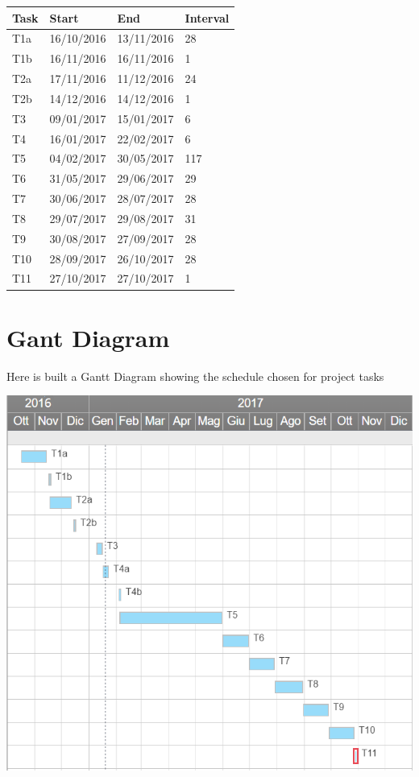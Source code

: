 \begin{center}
	\begin{tabulary}{\linewidth\tymin=70pt}{Y{1cm}|Y{3cm}|Y{3cm}|Y{1.7cm}}
		\textbf{Task} & \textbf{Start} & \textbf{End} & \textbf{Interval} \\ \hline
		T1a & 16/10/2016 & 13/11/2016 & 28\\ \hline
		T1b & 16/11/2016 & 16/11/2016 & 1\\ \hline
		T2a & 17/11/2016 & 11/12/2016 & 24\\ \hline
		T2b & 14/12/2016 & 14/12/2016 & 1\\ \hline
		T3 & 09/01/2017 & 15/01/2017 & 6\\ \hline
		T4 & 16/01/2017 & 22/02/2017 & 6\\ \hline
		T5 & 04/02/2017 & 30/05/2017 & 117\\ \hline
		T6 & 31/05/2017 & 29/06/2017 & 29\\ \hline
		T7 & 30/06/2017 & 28/07/2017 & 28\\ \hline
		T8 & 29/07/2017 & 29/08/2017 & 31\\ \hline
		T9 & 30/08/2017 & 27/09/2017 & 28\\ \hline
		T10 & 28/09/2017 & 26/10/2017 & 28\\ \hline
		T11 & 27/10/2017 & 27/10/2017 & 1\\
	\end{tabulary}
\end{center}

\section{Gant Diagram}
Here is built a Gantt Diagram showing the schedule chosen for \PowerEnJoy{} project tasks

\begin{center}
  \includegraphics[width=\textwidth]{Resources/GanttDiagram.PNG}
  \label{Gant Diagram}
\end{center}

